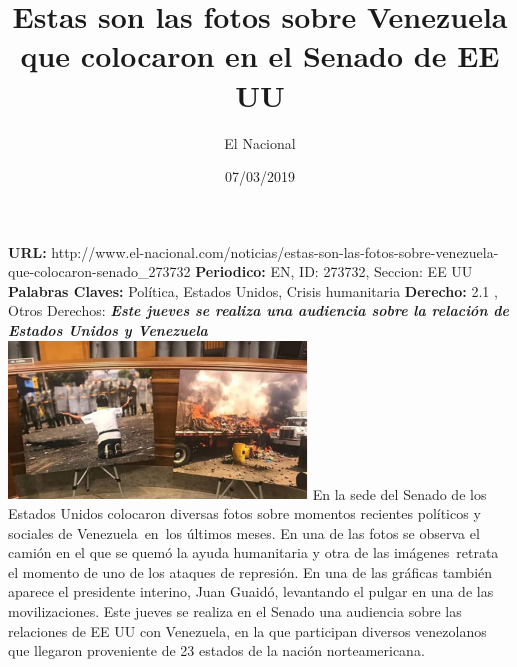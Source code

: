 \documentclass{article}%
\title{\textbf{Estas son las fotos sobre Venezuela que colocaron en el Senado de EE UU}}%
\author{El Nacional}%
\date{07/03/2019}%
\begin{document}
%
\normalsize%
\maketitle%
\textbf{URL: }%
http://www.el{-}nacional.com/noticias/estas{-}son{-}las{-}fotos{-}sobre{-}venezuela{-}que{-}colocaron{-}senado\_273732\newline%
%
\textbf{Periodico: }%
EN, %
ID: %
273732, %
Seccion: %
EE UU\newline%
%
\textbf{Palabras Claves: }%
Política, Estados Unidos, Crisis humanitaria\newline%
%
\textbf{Derecho: }%
2.1%
, Otros Derechos: %
\newline%
%
\textbf{\textit{Este jueves se realiza una audiencia sobre la relación de Estados Unidos y Venezuela}}%
\newline%
\newline%
%
\includegraphics[width=300px]{EN_273732.jpg}%
\newline%
%
En la sede del Senado de los Estados Unidos colocaron diversas fotos sobre momentos recientes políticos y sociales de Venezuela~en~los últimos meses.%
\newline%
%
En una de las fotos se observa el camión en el que se quemó la ayuda humanitaria y otra de las imágenes~retrata el momento de uno de los ataques de represión. En una de las gráficas también aparece el presidente interino, Juan Guaidó, levantando el pulgar en una de las movilizaciones.%
\newline%
%
Este jueves se realiza en el Senado una audiencia sobre las relaciones de EE UU con Venezuela, en la que participan diversos venezolanos que llegaron proveniente de 23 estados de la nación norteamericana.%
\newline%
%
\end{document}
